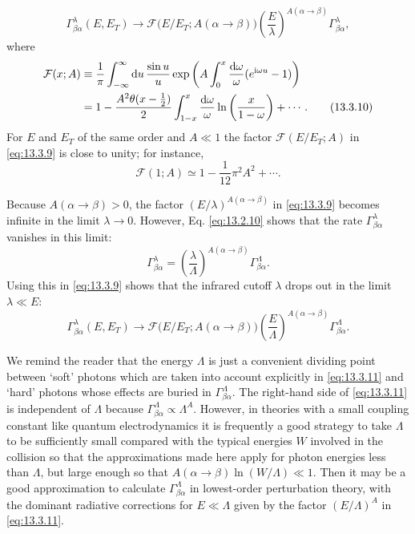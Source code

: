 \begin{equation}
\Gamma^\lambda_{\beta\alpha}(E,E_T)\to
\mathcal F\bigl(E/E_T;A(\alpha\to\beta)\bigr)
\left(\frac{E}{\lambda}\right)^{A(\alpha\to\beta)}
\Gamma^\lambda_{\beta\alpha},
\tag{13.3.9}\label{eq:13.3.9}
\end{equation}
where
\begin{align}
\mathcal F(x;A)
\equiv{}&\frac{1}{\pi}\int_{-\infty}^{\infty}\mathop{}\!\mathrm{d} u\,
\frac{\sin u}{u}\exp\left(A\int_0^x\frac{\mathop{}\!\mathrm{d}\omega}{\omega}
(e^{\mathrm{i}\omega u}-1)\right)\notag\\
={}&1-\frac{A^2\theta(x-\tfrac12)}{2}
\int_{1-x}^{x}\frac{\mathop{}\!\mathrm{d}\omega}{\omega}
\ln\left(\frac{x}{1-\omega}\right)+\cdots.
\tag{13.3.10}\label{eq:13.3.10}
\end{align}
For $E$ and $E_T$ of the same order and $A\ll1$ the factor
$\mathcal F(E/E_T;A)$ in \eqref{eq:13.3.9} is close to unity; for instance,
\[
\mathcal F(1;A)\simeq1-\frac{1}{12}\pi^2A^2+\cdots.
\]

Because $A(\alpha\to\beta)>0$, the factor
$(E/\lambda)^{A(\alpha\to\beta)}$ in \eqref{eq:13.3.9} becomes infinite in
the limit $\lambda\to0$. However, Eq. \eqref{eq:13.2.10} shows that the rate
$\Gamma^\lambda_{\beta\alpha}$ vanishes in this limit:
\[
\Gamma^\lambda_{\beta\alpha}
=\left(\frac{\lambda}{\Lambda}\right)^{A(\alpha\to\beta)}
\Gamma^\Lambda_{\beta\alpha}.
\]
Using this in \eqref{eq:13.3.9} shows that the infrared cutoff $\lambda$ drops
out in the limit $\lambda\ll E$:
\begin{equation}
\Gamma^\lambda_{\beta\alpha}(E,E_T)\to
\mathcal F\bigl(E/E_T;A(\alpha\to\beta)\bigr)
\left(\frac{E}{\Lambda}\right)^{A(\alpha\to\beta)}
\Gamma^\Lambda_{\beta\alpha}.
\tag{13.3.11}\label{eq:13.3.11}
\end{equation}

We remind the reader that the energy $\Lambda$ is just a convenient dividing
point between `soft' photons which are taken into account explicitly in
\eqref{eq:13.3.11} and `hard' photons whose effects are buried in
$\Gamma^\Lambda_{\beta\alpha}$. The right-hand side of \eqref{eq:13.3.11} is
independent of $\Lambda$ because
$\Gamma^\Lambda_{\beta\alpha}\propto\Lambda^A$. However, in theories with a
small coupling constant like quantum electrodynamics it is frequently a good
strategy to take $\Lambda$ to be sufficiently small compared with the typical
energies $W$ involved in the collision so that the approximations made here
apply for photon energies less than $\Lambda$, but large enough so that
$A(\alpha\to\beta)\ln(W/\Lambda)\ll1$. Then it may be a good approximation to
calculate $\Gamma^\Lambda_{\beta\alpha}$ in lowest-order perturbation theory,
with the dominant radiative corrections for $E\ll\Lambda$ given by the factor
$(E/\Lambda)^A$ in \eqref{eq:13.3.11}.


